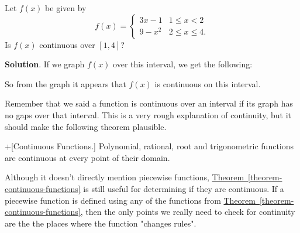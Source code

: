 \documentclass[10pt,]{book}
\theoremstyle{ptxplainnotitle}
\theoremstyle{ptxplaintitle}
\theoremstyle{ptxplainnotitle}
\theoremstyle{ptxplaintitle}
\theoremstyle{ptxplainnotitle}
\theoremstyle{ptxplaintitle}
\theoremstyle{ptxdefinitionnotitle}
\theoremstyle{ptxdefinitiontitle}
\theoremstyle{ptxdefinitionnotitle}
\theoremstyle{ptxdefinitiontitle}
\theoremstyle{ptxdefinitionnotitle}
\theoremstyle{ptxdefinitiontitle}
\theoremstyle{ptxdefinitionnotitle}
\theoremstyle{ptxdefinitiontitle}
\theoremstyle{ptxdefinitionnotitle}
\theoremstyle{ptxdefinitiontitle}
\numberwithin{equation}{section}
\begin{document}
\begin{example}\label{example-continuity-over-a-closed-interval}
\hypertarget{p-37}{}%
Let \(f(x)\) be given by%
\begin{equation*}
f(x) = \begin{cases} 3x-1 & 1\leq x< 2 \\ 9-x^{2} & 2\leq x\leq 4.\end{cases}
\end{equation*}
Is \(f(x)\) continuous over \([1,4]\)?%
\par\smallskip%
\noindent\textbf{Solution}.\hypertarget{solution-7}{}\quad%
\hypertarget{p-38}{}%
If we graph \(f(x)\) over this interval, we get the following:%
\begin{figure}
\centering
{
}
\end{figure}
\hypertarget{p-39}{}%
So from the graph it appears that \(f(x)\) is continuous on this interval.%
\end{example}
\hypertarget{p-40}{}%
Remember that we said a function is continuous over an interval if its graph has no gaps over that interval. This is a very rough explanation of continuity, but it should make the following theorem plausible.%
\begin{theorem}+[{Continuous Functions.}]\label{theorem-continuous-functions}
\hypertarget{p-41}{}%
Polynomial, rational, root and trigonometric functions are continuous at every point of their domain.%
\end{theorem}
\hypertarget{p-42}{}%
Although it doesn't directly mention piecewise functions, \hyperref[theorem-continuous-functions]{Theorem~\ref{theorem-continuous-functions}} is still useful for determining if they are continuous. If a piecewise function is defined using any of the functions from \hyperref[theorem-continuous-functions]{Theorem~\ref{theorem-continuous-functions}}, then the only points we really need to check for continuity are the the places where the function "changes rules".%
\end{document}
